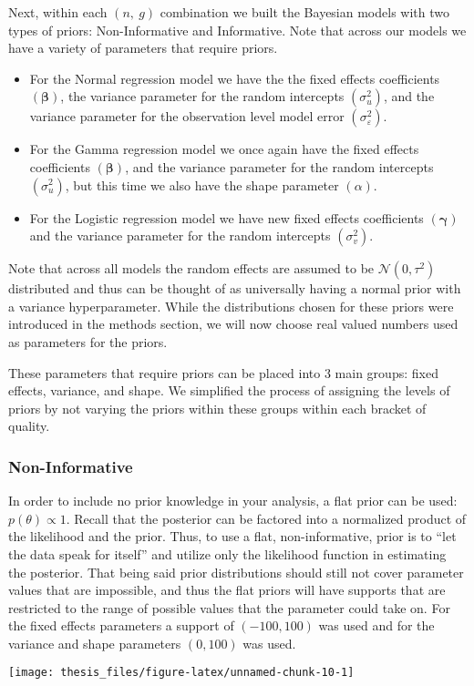 \documentclass[12pt,twoside]{reedthesis}
\begin{document}
Next, within each \((n,\ g)\) combination we built the Bayesian models with two types of priors: Non-Informative and Informative. Note that across our models we have a variety of parameters that require priors.
\begin{itemize}
\item
  For the Normal regression model we have the the fixed effects coefficients \((\boldsymbol{\beta})\), the variance parameter for the random intercepts \((\sigma_u^2)\), and the variance parameter for the observation level model error \((\sigma_{\varepsilon}^2)\).
\item
  For the Gamma regression model we once again have the fixed effects coefficients \((\boldsymbol{\beta})\), and the variance parameter for the random intercepts \((\sigma_u^2)\), but this time we also have the shape parameter \((\alpha)\).
\item
  For the Logistic regression model we have new fixed effects coefficients \((\boldsymbol{\gamma})\) and the variance parameter for the random intercepts \((\sigma_v^2)\).
\end{itemize}
Note that across all models the random effects are assumed to be \(\mathcal{N}(0, \tau^2)\) distributed and thus can be thought of as universally having a normal prior with a variance hyperparameter. While the distributions chosen for these priors were introduced in the methods section, we will now choose real valued numbers used as parameters for the priors.

These parameters that require priors can be placed into 3 main groups: fixed effects, variance, and shape. We simplified the process of assigning the levels of priors by not varying the priors within these groups within each bracket of quality.

\hypertarget{non-informative}{%
\subsubsection{Non-Informative}\label{non-informative}}

In order to include no prior knowledge in your analysis, a flat prior can be used: \(p(\theta) \propto 1\). Recall that the posterior can be factored into a normalized product of the likelihood and the prior. Thus, to use a flat, non-informative, prior is to ``let the data speak for itself'' and utilize only the likelihood function in estimating the posterior. That being said prior distributions should still not cover parameter values that are impossible, and thus the flat priors will have supports that are restricted to the range of possible values that the parameter could take on. For the fixed effects parameters a support of \((-100, 100)\) was used and for the variance and shape parameters \((0, 100)\) was used.
\begin{center}\texttt{[image: thesis\_files/figure-latex/unnamed-chunk-10-1]} \end{center}
\end{document}
